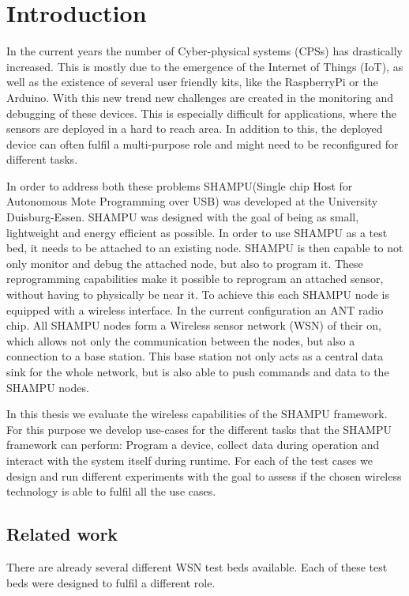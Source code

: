 \chapter{Introduction}
\label{sec:intro}
In the current years the number of Cyber-physical systems (CPSs) has drastically increased. This is mostly due to the emergence of the Internet of Things (IoT), as well as the existence of several user friendly kits, like the RaspberryPi or the Arduino. With this new trend new challenges are created in the monitoring and debugging of these devices. This is especially difficult for applications, where the sensors are deployed in a hard to reach area. In addition to this, the deployed device can often fulfil a multi-purpose role and might need to be reconfigured for different tasks.

In order to address both these problems SHAMPU(Single chip Host for Autonomous Mote Programming over USB)\cite{Smeets:2014:DAL:2602339.2602401} was developed at the University Duisburg-Essen. SHAMPU was designed with the goal of being as small, lightweight and energy efficient as possible. In order to use SHAMPU as a test bed, it needs to be attached to an existing node. SHAMPU is then capable to not only monitor and debug the attached node, but also to program it. These reprogramming capabilities make it possible to reprogram an attached sensor, without having to physically be near it. To achieve this each SHAMPU node is equipped with a wireless interface. In the current configuration an ANT\cite{DynastreamInnovationsInc.2013} radio chip. All SHAMPU nodes form a Wireless sensor network (WSN) of their on, which allows not only the communication between the nodes, but also a connection to a base station. This base station not only acts as a central data sink for the whole network, but is also able to push commands and data to the SHAMPU nodes.

In this thesis we evaluate the wireless capabilities of the SHAMPU framework. For this purpose we develop use-cases for the different tasks that the SHAMPU framework can perform: Program a device, collect data during operation and interact with the system itself during runtime. For each of the test cases we design and run different experiments with the goal to assess if the chosen wireless technology is able to fulfil all the use cases.

\section{Related work}
\label{sec:related_work}
There are already several different WSN test beds available. Each of these test beds were designed to fulfil a different role. 

